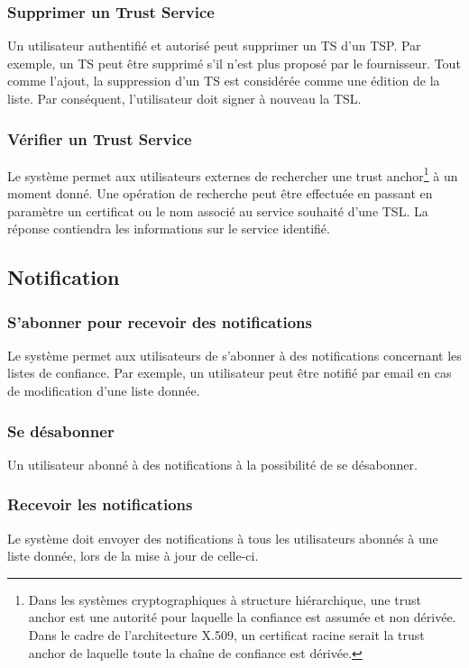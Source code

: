 \documentclass{tnreport}
\begin{document}
\subsubsection{Supprimer un Trust Service}
Un utilisateur authentifié et autorisé peut supprimer un TS d'un TSP. Par exemple, un TS peut être supprimé s'il n'est plus proposé par le fournisseur. Tout comme l'ajout, la suppression d'un TS est considérée comme une édition de la liste. Par conséquent, l'utilisateur doit signer à nouveau la TSL.
\subsubsection{Vérifier un Trust Service}
Le système permet aux utilisateurs externes de rechercher une 
trust anchor\footnote{Dans les systèmes cryptographiques à structure hiérarchique, une trust anchor est une autorité pour laquelle la confiance est assumée et non dérivée. Dans le cadre de l'architecture X.509, un certificat racine serait la trust anchor de laquelle toute la chaîne de confiance est dérivée.} 
à un moment donné. 
Une opération de recherche peut être effectuée en passant en paramètre un certificat ou le nom associé au service souhaité d'une TSL. La réponse contiendra les informations sur le service identifié.

\subsection{Notification}
\label{sec:notification}
\subsubsection{S'abonner pour recevoir des notifications}
Le système permet aux utilisateurs de s'abonner à des notifications concernant les listes de confiance. Par exemple, un utilisateur peut être notifié par email en cas de modification d'une liste donnée.
\subsubsection{Se désabonner}
Un utilisateur abonné à des notifications à la possibilité de se désabonner.
\subsubsection{Recevoir les notifications}
Le système doit envoyer des notifications à tous les utilisateurs abonnés à une liste donnée, lors de la mise à jour de celle-ci.
\end{document}
